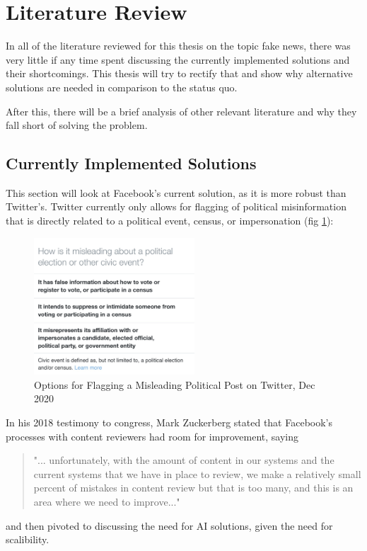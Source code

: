 \documentclass[preprint,review,12pt]{elsarticle}
\begin{document}
\section{Literature Review}
In all of the literature reviewed for this thesis on the topic fake news, there was very little if any time spent discussing the currently implemented solutions and their shortcomings. This thesis will try to rectify that and show why alternative solutions are needed in comparison to the status quo.

After this, there will be a brief analysis of other relevant literature and why they fall short of solving the problem.

\subsection{Currently Implemented Solutions}
This section will look at Facebook's current solution, as it is more robust than Twitter's. Twitter currently only allows for flagging of political misinformation that is directly related to a political event, census, or impersonation (fig \ref{img:TwitterPolitics}):
\begin{figure}[htp]
    \centering
    \includegraphics[width=6cm]{TwitterPolitics.jpg}
    \caption{Options for Flagging a Misleading Political Post on Twitter, Dec 2020}
    \label{img:TwitterPolitics}
\end{figure}

In his 2018 testimony to congress, Mark Zuckerberg stated that Facebook's processes with content reviewers had room for improvement, saying \begin{quote}"... unfortunately, with the amount of content in our systems and the current systems that we have in place to review, we make a relatively small percent of mistakes in content review but that is too many, and this is an area where we need to improve..." \cite{energy2018facebook}\end{quote} and then pivoted to discussing the need for AI solutions, given the need for scalibility.
\end{document}
